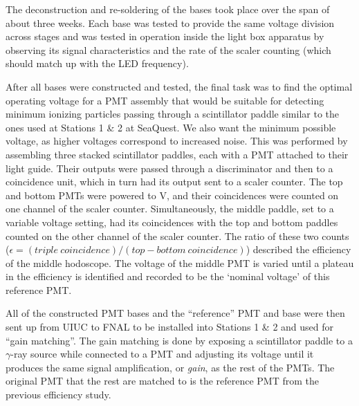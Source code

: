 The deconstruction and re-soldering of the bases took place over the span of about three weeks. Each base was tested to provide the same voltage division across stages and was tested in operation inside the light box apparatus by observing its signal characteristics and the rate of the scaler counting (which should match up with the LED frequency).

After all bases were constructed and tested, the final task was to find the optimal operating voltage for a PMT assembly that would be suitable for detecting minimum ionizing particles passing through a scintillator paddle similar to the ones used at Stations 1 \& 2 at SeaQuest. We also want the minimum possible voltage, as higher voltages correspond to increased noise. This was performed by assembling three stacked scintillator paddles, each  with a PMT attached to their light guide. Their outputs were passed through a discriminator and then to a coincidence unit, which in turn had its output sent to a scaler counter. The top and bottom PMTs were powered to \unit[-1500]{V}, and their coincidences were counted on one channel of the scaler counter. Simultaneously, the middle paddle, set to a variable voltage setting, had its coincidences with the top and bottom paddles counted on the other channel of the scaler counter. The ratio of these two counts ($\epsilon = (triple\ coincidence) / (top-bottom\ coincidence)$) described the efficiency of the middle hodoscope. The voltage of the middle PMT is varied until a plateau in the efficiency is identified and recorded to be the `nominal voltage' of this reference PMT.

All of the constructed PMT bases and the ``reference'' PMT and base were then sent up from UIUC to FNAL to be installed into Stations 1 \& 2 and used for ``gain matching''. The gain matching is done by exposing a scintillator paddle to a $\gamma$-ray source while connected to a PMT and adjusting its voltage until it produces the same signal amplification, or \emph{gain}, as the rest of the PMTs. The original PMT that the rest are matched to is the reference PMT from the previous efficiency study.

